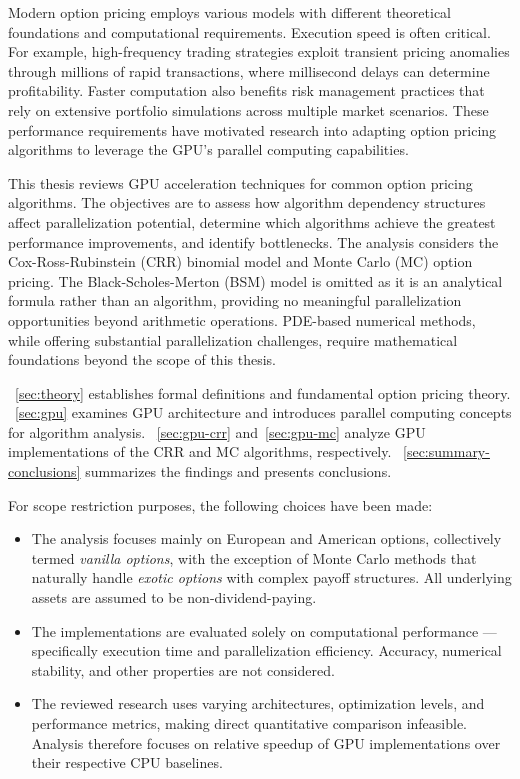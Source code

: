 \documentclass[english,12pt,a4paper,pdftex,sci,utf8]{aaltothesis}
\begin{document}
Modern option pricing employs various models with different theoretical foundations and computational requirements. Execution speed is often critical. For example, high-frequency trading strategies exploit transient pricing anomalies through millions of rapid transactions, where millisecond delays can determine profitability. Faster computation also benefits risk management practices that rely on extensive portfolio simulations across multiple market scenarios. These performance requirements have motivated research into adapting option pricing algorithms to leverage the GPU's parallel computing capabilities.

This thesis reviews GPU acceleration techniques for common option pricing algorithms. The objectives are to assess how algorithm dependency structures affect parallelization potential, determine which algorithms achieve the greatest performance improvements, and identify bottlenecks. The analysis considers the Cox-Ross-Rubinstein (CRR) binomial model and Monte Carlo (MC) option pricing. The Black-Scholes-Merton (BSM) model is omitted as it is an analytical formula rather than an algorithm, providing no meaningful parallelization opportunities beyond arithmetic operations. PDE-based numerical methods, while offering substantial parallelization challenges, require mathematical foundations beyond the scope of this thesis.

~\cref{sec:theory} establishes formal definitions and fundamental option pricing theory. ~\cref{sec:gpu} examines GPU architecture and introduces parallel computing concepts for algorithm analysis. ~\cref{sec:gpu-crr} and~\cref{sec:gpu-mc} analyze GPU implementations of the CRR and MC algorithms, respectively. ~\cref{sec:summary-conclusions} summarizes the findings and presents conclusions.

For scope restriction purposes, the following choices have been made:
\begin{itemize}
\item The analysis focuses mainly on European and American options, collectively termed \emph{vanilla options}, with the exception of Monte Carlo methods that naturally handle \emph{exotic options} with complex payoff structures. All underlying assets are assumed to be non-dividend-paying.
    
\item The implementations are evaluated solely on computational performance --- specifically execution time and parallelization efficiency. Accuracy, numerical stability, and other properties are not considered.

\item The reviewed research uses varying architectures, optimization levels, and performance metrics, making direct quantitative comparison infeasible. Analysis therefore focuses on relative speedup of GPU implementations over their respective CPU baselines.
\end{itemize}
\end{document}
